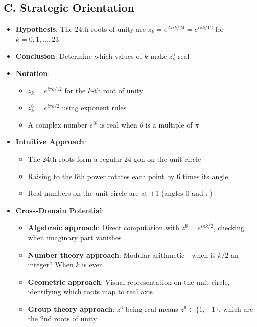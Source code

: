 \documentclass[]{article}
\begin{document}
\begin{problemconfigbox}
\subsection*{C. Strategic Orientation}
\begin{itemize}[leftmargin=*]
    \item \textbf{Hypothesis}: The 24th roots of unity are $z_k = e^{2\pi i k/24} = e^{i\pi k/12}$ for $k = 0, 1, \ldots, 23$
    \item \textbf{Conclusion}: Determine which values of $k$ make $z_k^6$ real
    \item \textbf{Notation}: 
    \begin{itemize}
        \item $z_k = e^{i\pi k/12}$ for the $k$-th root of unity
        \item $z_k^6 = e^{i\pi k/2}$ using exponent rules
        \item A complex number $e^{i\theta}$ is real when $\theta$ is a multiple of $\pi$
    \end{itemize}
    \item \textbf{Intuitive Approach}: 
    \begin{itemize}
        \item The 24th roots form a regular 24-gon on the unit circle
        \item Raising to the 6th power rotates each point by 6 times its angle
        \item Real numbers on the unit circle are at $\pm 1$ (angles $0$ and $\pi$)
    \end{itemize}
    \item \textbf{Cross-Domain Potential}: 
    \begin{itemize}
        \item \textbf{Algebraic approach}: Direct computation with $z^6 = e^{i\pi k/2}$, checking when imaginary part vanishes
        \item \textbf{Number theory approach}: Modular arithmetic - when is $k/2$ an integer? When $k$ is even
        \item \textbf{Geometric approach}: Visual representation on the unit circle, identifying which roots map to real axis
        \item \textbf{Group theory approach}: $z^6$ being real means $z^6 \in \{1, -1\}$, which are the 2nd roots of unity
    \end{itemize}
\end{itemize}
\end{problemconfigbox}
\end{document}
